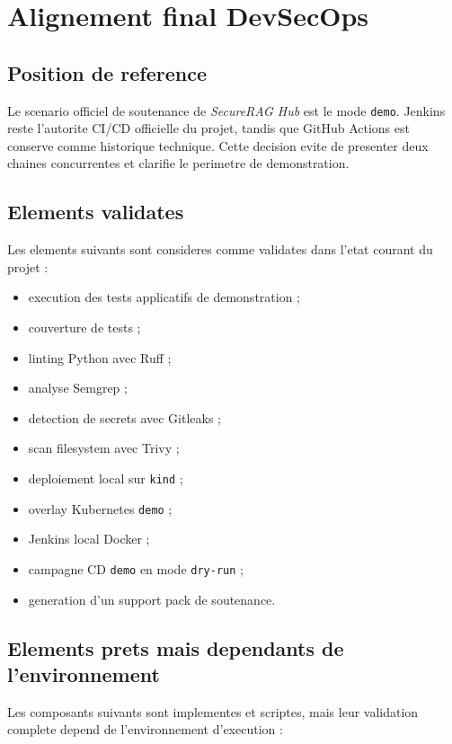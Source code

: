 \section{Alignement final DevSecOps}

\subsection{Position de reference}

Le scenario officiel de soutenance de \textit{SecureRAG Hub} est le mode
\texttt{demo}. Jenkins reste l'autorite CI/CD officielle du projet, tandis que
GitHub Actions est conserve comme historique technique. Cette decision evite de
presenter deux chaines concurrentes et clarifie le perimetre de demonstration.

\subsection{Elements validates}

Les elements suivants sont consideres comme validates dans l'etat courant du
projet :

\begin{itemize}
  \item execution des tests applicatifs de demonstration ;
  \item couverture de tests ;
  \item linting Python avec Ruff ;
  \item analyse Semgrep ;
  \item detection de secrets avec Gitleaks ;
  \item scan filesystem avec Trivy ;
  \item deploiement local sur \texttt{kind} ;
  \item overlay Kubernetes \texttt{demo} ;
  \item Jenkins local Docker ;
  \item campagne CD \texttt{demo} en mode \texttt{dry-run} ;
  \item generation d'un support pack de soutenance.
\end{itemize}

\subsection{Elements prets mais dependants de l'environnement}

Les composants suivants sont implementes et scriptes, mais leur validation
complete depend de l'environnement d'execution :

